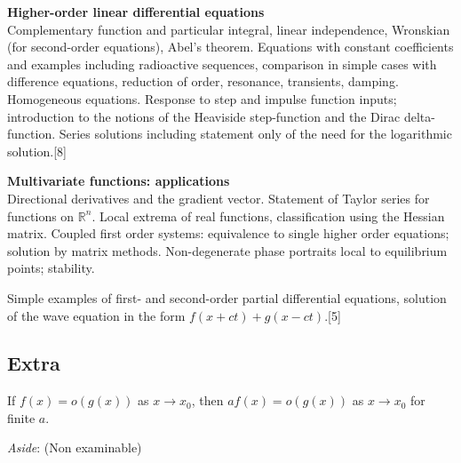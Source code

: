 {  \vspace{10pt}
  \noindent\textbf{Higher-order linear differential equations}\\
  Complementary function and particular integral, linear independence, Wronskian (for second-order equations), Abel's theorem. Equations with constant coefficients and examples including radioactive sequences, comparison in simple cases with difference equations, reduction of order, resonance, transients, damping. Homogeneous equations. Response to step and impulse function inputs; introduction to the notions of the Heaviside step-function and the Dirac delta-function. Series solutions including statement only of the need for the logarithmic solution.\hspace*{\fill}[8]

  \vspace{10pt}
  \noindent\textbf{Multivariate functions: applications}\\
  Directional derivatives and the gradient vector. Statement of Taylor series for functions on $\mathbb{R}^n$. Local extrema of real functions, classification using the Hessian matrix. Coupled first order systems: equivalence to single higher order equations; solution by matrix methods. Non-degenerate phase portraits local to equilibrium points; stability.

  \vspace{5pt}
  \noindent Simple examples of first- and second-order partial differential equations, solution of the wave equation in the form $f(x + ct) + g(x - ct)$.\hspace*{\fill}[5]}

\tableofcontents





\subsection{Extra}

If \(f(x) = o(g(x))\) as \(x \to x_0\), then \(af(x) = o(g(x))\) as \(x \to x_0\) for finite \(a\).

\emph{Aside}: (Non examinable)

